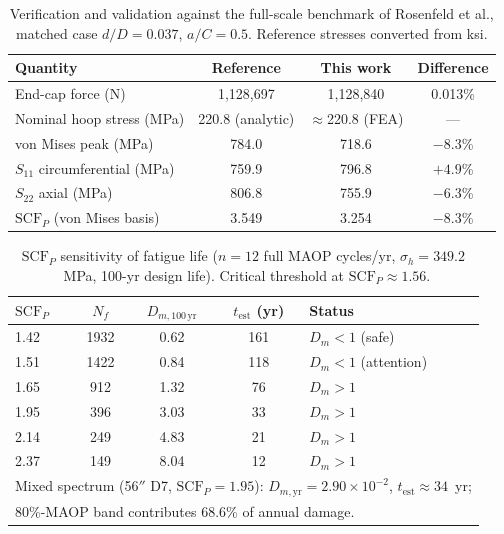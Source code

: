 \begin{table}[t]
\centering
\caption{Verification and validation against the full-scale benchmark of Rosenfeld et al.,
matched case $d/D=0.037$, $a/C=0.5$. Reference stresses converted from ksi.}
\label{tab:validation}
\begin{tabular}{lccc}
\toprule
Quantity & Reference & This work & Difference \\
\midrule
End-cap force (N) & 1{,}128{,}697 & 1{,}128{,}840 & 0.013\% \\
Nominal hoop stress (MPa) & 220.8 (analytic) & $\approx$220.8 (FEA) & --- \\
von Mises peak (MPa) & 784.0 & 718.6 & $-8.3$\% \\
$S_{11}$ circumferential (MPa) & 759.9 & 796.8 & $+4.9$\% \\
$S_{22}$ axial (MPa) & 806.8 & 755.9 & $-6.3$\% \\
$\mathrm{SCF}_P$ (von Mises basis) & 3.549 & 3.254 & $-8.3$\% \\
\bottomrule
\end{tabular}
\end{table}

\begin{table}[t]
\centering
\caption{$\mathrm{SCF}_P$ sensitivity of fatigue life ($n=12$ full MAOP cycles/yr,
$\sigma_h=349.2$~MPa, 100-yr design life). Critical threshold at
$\mathrm{SCF}_P\approx1.56$.}
\label{tab:threshold}
\begin{tabular}{lcccl}
\toprule
$\mathrm{SCF}_P$ & $N_f$ & $D_{m,100\,\mathrm{yr}}$ & $t_{\mathrm{est}}$ (yr) & Status \\
\midrule
1.42 & 1932 & 0.62 & 161 & $D_m<1$ (safe) \\
1.51 & 1422 & 0.84 & 118 & $D_m<1$ (attention) \\
1.65 &  912 & 1.32 &  76 & $D_m>1$ \\
1.95 &  396 & 3.03 &  33 & $D_m>1$ \\
2.14 &  249 & 4.83 &  21 & $D_m>1$ \\
2.37 &  149 & 8.04 &  12 & $D_m>1$ \\
\midrule
\multicolumn{5}{l}{Mixed spectrum (56$''$ D7, $\mathrm{SCF}_P=1.95$):
$D_{m,\mathrm{yr}}=2.90\times10^{-2}$, $t_{\mathrm{est}}\approx34$~yr;} \\
\multicolumn{5}{l}{80\%-MAOP band contributes 68.6\% of annual damage.} \\
\bottomrule
\end{tabular}
\end{table}
